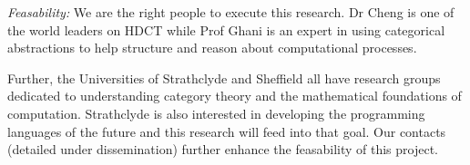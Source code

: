 \documentclass[a4paper,10pt]{article}
\begin{document}
{\em Feasability:} We are the right people to execute this
research. Dr Cheng is one of the world leaders on HDCT while Prof
Ghani is an expert in using categorical abstractions to help structure
and reason about computational processes.

Further, the Universities of Strathclyde and Sheffield all have
research groups dedicated to understanding category theory and the
mathematical foundations of computation. Strathclyde is also
interested in developing the programming languages of the future and
this research will feed into that goal. Our contacts (detailed under
dissemination) further enhance the feasability of this project.





\vspace*{0.02in}




\small



















\pagebreak



\pagebreak
\end{document}
